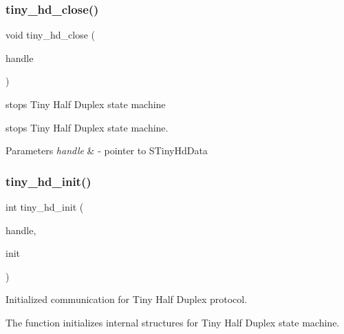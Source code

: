 \subsubsection{\texorpdfstring{tiny\+\_\+hd\+\_\+close()}{tiny\_hd\_close()}}
{\footnotesize\ttfamily void tiny\+\_\+hd\+\_\+close (\begin{DoxyParamCaption}\item[{\hyperlink{group__HALF__DUPLEX__API_gaf9f81ad129b754a780dfca5dcd7f7cf9}{S\+Tiny\+Hd\+Data} $\ast$}]{handle }\end{DoxyParamCaption})}



stops Tiny Half Duplex state machine 

stops Tiny Half Duplex state machine.


\begin{DoxyParams}{Parameters}
{\em handle} & -\/ pointer to S\+Tiny\+Hd\+Data \\
\hline
\end{DoxyParams}
\mbox{\label{group__HALF__DUPLEX__API_ga747e6a3a0b5d2a9e1fe0c143c20057e9}} 
\subsubsection{\texorpdfstring{tiny\+\_\+hd\+\_\+init()}{tiny\_hd\_init()}}
{\footnotesize\ttfamily int tiny\+\_\+hd\+\_\+init (\begin{DoxyParamCaption}\item[{\hyperlink{group__HALF__DUPLEX__API_gaf9f81ad129b754a780dfca5dcd7f7cf9}{S\+Tiny\+Hd\+Data} $\ast$}]{handle,  }\item[{\hyperlink{group__HALF__DUPLEX__API_ga784f1a0f0ae7f06da4bc288fa3f22408}{S\+Tiny\+Hd\+Init} $\ast$}]{init }\end{DoxyParamCaption})}



Initialized communication for Tiny Half Duplex protocol. 

The function initializes internal structures for Tiny Half Duplex state machine.


